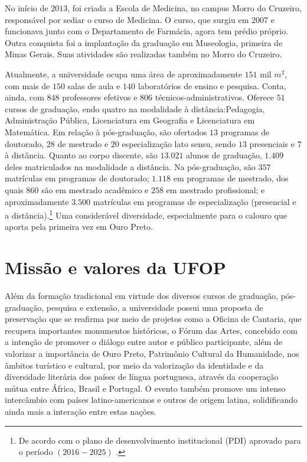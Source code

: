 No início de $2013$, foi criada a Escola de Medicina, no campus Morro do Cruzeiro, responsável por sediar o curso de Medicina. O curso, que surgiu em $2007$ e funcionava junto com o Departamento de Farmácia, agora tem prédio próprio. Outra conquista foi a implantação da graduação em Museologia, primeira de Minas Gerais. Suas atividades são realizadas também no Morro do Cruzeiro.

Atualmente, a universidade ocupa uma área de aproximadamente $151$ mil $m^2$, com mais de $150$ salas de aula e $140$ laboratórios de ensino e pesquisa. Conta, ainda, com $848$ professores efetivos e $806$ técnicos-administrativos. Oferece $51$ cursos de graduação, endo quatro na modalidade à distância:Pedagogia, Administração Pública, Licenciatura em Geografia e Licenciatura em Matemática. Em relação à pós-graduação, são ofertados $13$ programas de doutorado, $28$ de mestrado e $20$ especialização lato sensu, sendo $13$ presenciais e $7$ à distância. Quanto ao corpo discente, são $13.021$ alunos de graduação, $1.409$ deles matriculados na modalidade a distância. Na pós-graduação, são $357$ matrículas em programas de doutorado; $1.118$ em programas de mestrado, dos quais $860$ são em mestrado acadêmico e $258$ em mestrado profissional; e aproximadamente $3.500$ matrículas em programas de especialização (presencial e a distância).\footnote{De acordo com o plano de desenvolvimento institucional (PDI) aprovado para o período $(2016-2025)$ \cite{resolucao-cuni-1}.} Uma considerável diversidade, especialmente para o calouro que aporta pela primeira vez em Ouro Preto.
%
\section{Missão e valores da UFOP}
%
Além da formação tradicional em virtude dos diversos cursos de graduação, pós-graduação, pesquisa e extensão, a universidade possui uma proposta de preservação que se reafirma por meio de  projetos como a Oficina de Cantaria, que recupera importantes monumentos históricos, o Fórum das Artes, concebido com a intenção de promover o diálogo entre autor e público participante, além de valorizar a importância de Ouro Preto, Patrimônio Cultural da Humanidade, nos âmbitos turístico e cultural, por meio da valorização da identidade e da diversidade literária dos países de língua portuguesa, através da cooperação mútua entre África, Brasil e Portugal. O evento também promove um intenso intercâmbio com países latino-americanos e outros de origem latina, solidificando ainda mais a interação entre estas nações.


